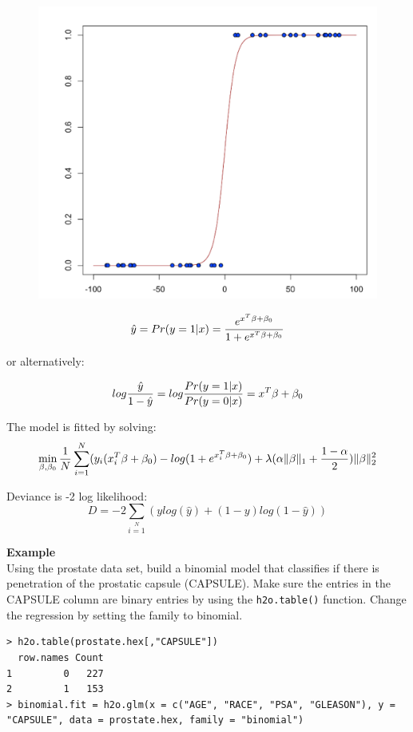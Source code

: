 \documentclass{article}[11pt]
\begin{document}
\begin{figure}[h]
\centering
\includegraphics[scale=0.5]{scurve.png}
\end{figure}


 

\[ \hat{y} = Pr(y = 1|x) = {e^{x^T\beta + \beta_0} \over 1 + e^{x^T \beta + \beta_0} } \]

or alternatively:


\[log {\hat{y} \over 1- \hat{y}} = log{Pr(y=1|x) \over Pr(y=0|x)} = x^T \beta + \beta_0\]

The model is fitted by solving:
\[  \min\limits_{\beta,\beta_0} { {1 \over N}\sum\limits_{i=1}\limits^{N}(y_i (x_i^{T}\beta  + \beta_0) - log (1 + e^{x_i^{T}\beta  + \beta_0} )  + \lambda (\alpha \|\beta \|_1 + {1-\alpha \over 2}) \| \beta \|_2^2} \]

Deviance is -2 log likelihood:
\[D = -2\sum\limits_{i=1}\limits^{N}{(y log(\hat{y}) + (1 - y)log(1-\hat{y})  )}\]

\textbf{Example}\\

Using the prostate data set, build a binomial model that classifies if there is penetration of the prostatic capsule (CAPSULE). Make sure the entries in the CAPSULE column are binary entries by using the \texttt{h2o.table()} function. Change the regression by setting the family to binomial.
\begin{lstlisting}[breaklines,basicstyle=\ttfamily]
> h2o.table(prostate.hex[,"CAPSULE"])
  row.names Count
1         0   227
2         1   153
> binomial.fit = h2o.glm(x = c("AGE", "RACE", "PSA", "GLEASON"), y = "CAPSULE", data = prostate.hex, family = "binomial")
\end{lstlisting}
\end{document}
